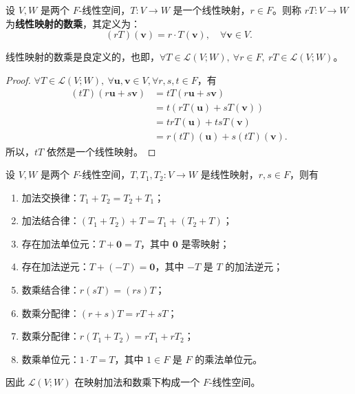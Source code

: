\begin{definition}[线性映射的数乘]
    设 $V,W$ 是两个 $F$-线性空间，$T:V\to W$ 是一个线性映射，$r\in F$。则称 $rT:V\to W$ 为\textbf{线性映射的数乘}，其定义为：
    \[
        (rT)(\mathbf{v}) = r\cdot T(\mathbf{v}), \quad \forall \mathbf{v}\in V.
    \]
\end{definition}

\begin{proposition}
    线性映射的数乘是良定义的，也即，$\forall T\in \mathcal{L}(V;W),\ \forall r\in F,\ rT\in \mathcal{L}(V;W)$。
\end{proposition}

\begin{proof}
    $\forall T\in \mathcal{L}(V;W),\ \forall \mathbf{u},\mathbf{v}\in V, \forall r,s,t \in F$，有
    \begin{align*}
        (tT)(r\mathbf{u}+s\mathbf{v}) &= tT(r\mathbf{u}+s\mathbf{v}) \\
        &= t(rT(\mathbf{u}) + sT(\mathbf{v})) \\
        &= trT(\mathbf{u}) + tsT(\mathbf{v}) \\
        &= r(tT)(\mathbf{u}) + s(tT)(\mathbf{v}).
    \end{align*}
    所以，$tT$ 依然是一个线性映射。
\end{proof}

\begin{proposition}[线性映射的线性空间]
    设 $V,W$ 是两个 $F$-线性空间，$T,T_1,T_2:V\to W$ 是线性映射，$r,s\in F$，则有
    \begin{enumerate}
        \item 加法交换律：$T_1+T_2 = T_2+T_1$；
        \item 加法结合律：$(T_1+T_2)+T = T_1+(T_2+T)$；
        \item 存在加法单位元：$T+\mathbf{0} = T$，其中 $\mathbf{0}$ 是零映射；
        \item 存在加法逆元：$T+(-T) = \mathbf{0}$，其中 $-T$ 是 $T$ 的加法逆元；
        \item 数乘结合律：$r(sT) = (rs)T$；
        \item 数乘分配律：$ (r+s)T = rT + sT $；
        \item 数乘分配律：$ r(T_1 + T_2) = rT_1 + rT_2 $；
        \item 数乘单位元：$1\cdot T = T$，其中 $1\in F$ 是 $F$ 的乘法单位元。
    \end{enumerate}
    因此 $\mathcal{L}(V;W)$ 在映射加法和数乘下构成一个 $F$-线性空间。
    \label{prop:linear_map_linear_space}
\end{proposition}
\vspace{1em}

